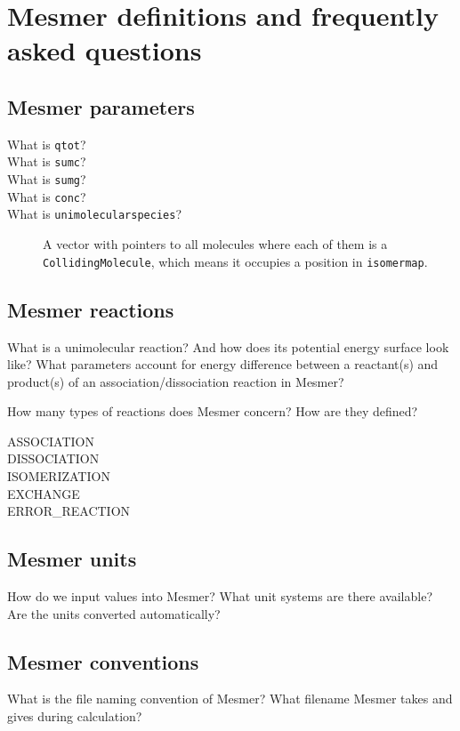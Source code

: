 \chapter*{Mesmer definitions and frequently asked questions}

\section*{Mesmer parameters}

\begin{description}
\item[What is \texttt{qtot}?]{}

\item[What is \texttt{sumc}?]{}

\item[What is \texttt{sumg}?]{}

\item[What is \texttt{conc}?]{}

\item[What is \texttt{unimolecularspecies}?]{A vector with pointers to all molecules where each of them is a \texttt{CollidingMolecule}, which means it occupies a position in \texttt{isomermap}.}

\end{description}

\section*{Mesmer reactions}
What is a unimolecular reaction? And how does its potential energy surface look like?
What parameters account for energy difference between a reactant(s) and product(s) of an association/dissociation reaction in Mesmer?

How many types of reactions does Mesmer concern? How are they defined?



\begin{description}
\item[ASSOCIATION]{}
\item[DISSOCIATION]{}
\item[ISOMERIZATION]{}
\item[EXCHANGE]{}
\item[ERROR\_REACTION]{}
\end{description}

\section*{Mesmer units}
How do we input values into Mesmer? What unit systems are there available? Are the units converted automatically?

\section*{Mesmer conventions}

What is the file naming convention of Mesmer? What filename Mesmer takes and gives during calculation?
